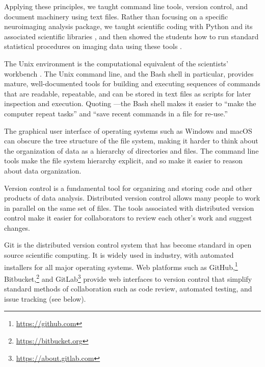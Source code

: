 Applying these principles, we taught command line tools, version control, and
document machinery using text files.  Rather than focusing on a specific
neuroimaging analysis package, we taught scientific coding with Python and its
associated scientific libraries \citep{millman2011python, perez2011python}, and
then showed the students how to run standard statistical procedures on imaging
data using these tools \citep{millman2007analysis}.

The Unix environment is the computational equivalent of the scientists'
workbench \citep{preeyanon2014reproducible}.  The Unix command line, and the
Bash shell in particular, provides mature, well-documented tools for building
and executing sequences of commands that are readable, repeatable, and can be
stored in text files as scripts for later inspection and execution.  Quoting
\cite{wilson2014best}---the Bash shell makes it easier to ``make the computer
repeat tasks'' and ``save recent commands in a file for re-use.''

The graphical user interface of operating systems such as Windows and macOS
can obscure the tree structure of the file system, making it harder to think
about the organization of data as a hierarchy of directories and files.  The
command line tools make the file system hierarchy explicit, and so make it
easier to reason about data organization.


Version control is a fundamental tool for organizing and storing code and
other products of data analysis.
Distributed version control allows many people to work in parallel on the
same set of files.
The tools associated with distributed version control make it easier for
collaborators to review each other's work and suggest changes.

Git is the distributed version control system that has become standard in
open source scientific computing. It is widely used in industry, with automated
installers for all major operating systems.
Web platforms such as GitHub,\footnote{\url{https://github.com}}
Bitbucket,\footnote{\url{https://bitbucket.org}} and
GitLab\footnote{\url{https://about.gitlab.com}} provide web interfaces to
version control that simplify standard methods of collaboration such as code
review, automated testing, and issue tracking (see below).

